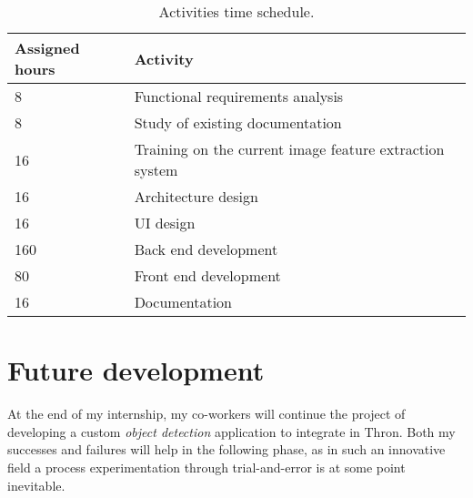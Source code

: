 \begin{center}
\begin{table}
    \caption{Activities time schedule.}
    \begin{tabular}{ | p{3cm} | p{9cm} |}
    \hline
    \textbf{Assigned hours} & \textbf{Activity} \\ \hline
    8 & Functional requirements analysis \\ \hline
    8 & Study of existing documentation \\ \hline
    16 & Training on the current image feature extraction system \\ \hline
    16 & Architecture design \\ \hline
    16 & UI design \\ \hline
    160 & Back end development \\ \hline
    80 & Front end development \\ \hline
		16 & Documentation \\ \hline
   \end{tabular}
\end{table}
\end{center}


\section{Future development}
At the end of my internship, my co-workers will continue the project of developing a custom \emph{object detection} application to integrate in Thron. Both my successes and failures will help in the following phase, as in such an innovative field a process experimentation through trial-and-error is at some point inevitable.

